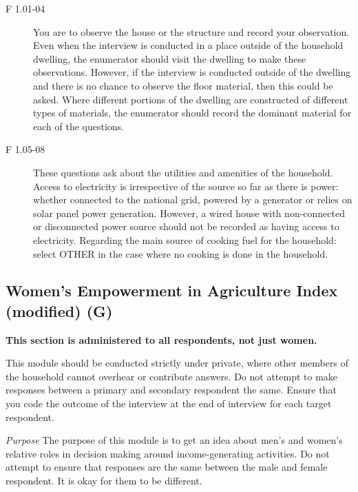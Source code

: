 \documentclass[a4paper]{refart}
\begin{document}
\begin{description}
\item[F 1.01-04] You are to observe the house or the structure and record your observation. Even when the interview is conducted in a place outside of the household dwelling, the enumerator should visit the dwelling to make these observations. However, if the interview is conducted outside of the dwelling and there is no chance to observe the floor material, then this could be asked. Where different portions of the dwelling are constructed of different types of materials, the enumerator should record the dominant material for each of the questions.
\item[F 1.05-08] These questions ask about the utilities and amenities of the household. Access to electricity is irrespective of the source so far as there is power: whether connected to the national grid, powered by a generator or relies on solar panel power generation. However, a wired house with non-connected or disconnected power source should not be recorded as having access to electricity. Regarding the main source of cooking fuel for the household: select OTHER in the case where no cooking is done in the household.
\end{description}

\subsection{Women's Empowerment in Agriculture Index (modified) (G)}
\textbf{This section is administered to all respondents, not just women.}

This module should be conducted strictly under private, where other members of the household cannot overhear or contribute answers. Do not attempt to make responses between a primary and secondary respondent the same. Ensure that you code the outcome of the interview at the end of interview for each target respondent.


\textit{Purpose}
The purpose of this module is to get an idea about men's and women’s relative roles in decision making around income-generating activities. Do not attempt to ensure that responses are the same between the male and female respondent. It is okay for them to be different.
\end{document}
